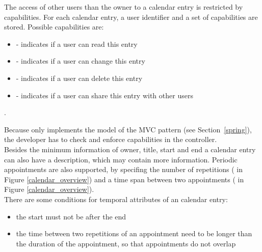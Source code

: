 The access of other users than the owner to a calendar entry is restricted by capabilities.
For each calendar entry, a user identifier and a set of capabilities are stored.
Possible capabilities are:
\begin{itemize}
    \item {} - indicates if a user can read this entry
    \item {} - indicates if a user can change this entry
    \item {} - indicates if a user can delete this entry
    \item {} - indicates if a user can share this entry with other users
\end{itemize}.

Because \salespoint{} only implements the model of the MVC pattern (see Section~\ref{spring}), the developer has to check and enforce capabilities in the controller.
\\

Besides the minimum information of owner, title, start and end a calendar entry can also have a description, which may contain more information.
Periodic appointments are also supported, by specifing the number of repetitions ( in Figure \ref{calendar_overview}) and a time span between two appointments ( in Figure \ref{calendar_overview}).
\\

There are some conditions for temporal attributes of an calendar entry:
\begin{itemize}
    \item the start must not be after the end
    \item the time between two repetitions of an appointment need to be longer than the duration of the appointment, so that appointments do not overlap
\end{itemize}
